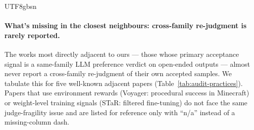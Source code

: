\documentclass{article}
\begin{document}
\begin{CJK*}{UTF8}{gbsn}
\paragraph{What's missing in the closest neighbours: cross-family
re-judgment is rarely reported.} The works most directly adjacent
to ours --- those whose primary acceptance signal is a same-family
LLM preference verdict on open-ended outputs --- almost never
report a cross-family re-judgment of their own accepted samples.
We tabulate this for five well-known adjacent papers
(Table~\ref{tab:audit-practices}). Papers that use environment
rewards (Voyager: procedural success in Minecraft) or weight-level
training signals (STaR: filtered fine-tuning) do not face the same
judge-fragility issue and are listed for reference only with
``n/a'' instead of a missing-column dash.


\end{CJK*}
\end{document}
